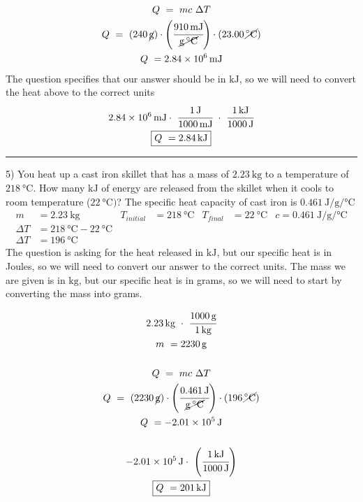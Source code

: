 \documentclass[12pt, oneside, letterpaper]{book}
\begin{document}
\begin{gather*}
    Q\ =\ mc\ \Delta T
    \\
    Q\ =\ (\qty{240}{\cancel\gram})  
        \cdot \left(\cfrac{\qty{910}{\milli\joule}}{\cancel{\si{\gram\degreeCelsius}}} \right) 
        \cdot (\qty{23.00}{\cancel \degreeCelsius})
    \\
    Q\ =\qty{2.84e6}{\milli\joule}
\end{gather*}
The question specifies that our answer should be in $\si{\kilo\joule}$, so we will need to convert the heat above to the correct units
\begin{gather*}
    \qty{2.84e6}{\milli\joule}  \cdot\ 
    \cfrac{\qty{1}{\joule}}{\qty{1000}{\milli\joule}}\   \cdot\ 
    \cfrac{\qty{1}{\kilo\joule}}{\qty{1000}{\joule}} 
    \\
    \boxed{Q\ = \qty{2.84}{\kilo\joule}}
\end{gather*}
\hrule 
5) You heat up a cast iron skillet that has a mass of $\qty{2.23}{\kilo\gram}$ to a temperature of $\qty{218}{\degreeCelsius}$. How many $\si{\kilo\joule}$ of energy are released from the skillet when it cools to room temperature ($\qty{22}{\degreeCelsius})$? The specific heat capacity of cast iron is $\qty[per-mode=fraction]{0.461}{\joule\per\gram\per\degreeCelsius}$
\begin{align*}
 m &= \qty{2.23}{\kilo\gram}  
    & T_{initial}&= \qty{218}{\degreeCelsius} 
    & T_{final} &= \qty{22}{\degreeCelsius} 
    & c = \qty[per-mode=fraction]{0.461}{\joule\per\gram\per\degreeCelsius} 
 \\
 \Delta T &= \qty{218}{\degreeCelsius} - \qty{22}{\degreeCelsius}
 \\
 \Delta T &= \qty{196}{\degreeCelsius}
\end{align*}
The question is asking for the heat released in $\si{\kilo\joule}$, but our specific heat is in Joules, so we will need to convert our answer to the correct units. The mass we are given is in $\si{\kilo\gram}$, but our specific heat is in grams, so we will need to start by converting the mass into grams.

\begin{gather*}
    \qty{2.23}{\cancel{\kilo\gram}}\ \cdot\ \cfrac{\qty{1000}{\gram}}{\qty{1}{\cancel{\kilo\gram}}} 
    \\
    m\ = \qty{2230}{\gram}
    \\
    \\
    Q\ =\ mc\ \Delta T
    \\
    Q\ =\ (\qty{2230}{\cancel\gram})  
        \cdot \left(\cfrac{\qty{0.461}{\joule}}{\cancel{\si{\gram\degreeCelsius}}} \right) 
        \cdot (\qty{196}{\cancel \degreeCelsius})
    \\
    Q\ = \qty{-2.01e5}{\joule}
    \\
    \\
    \qty{-2.01e5}{\cancel{\joule}} \cdot\ 
        \left(\cfrac{\qty{1}{\kilo\joule}}{\qty{1000}{\cancel{\joule}}} \right)
    \\
    \boxed{Q\ =\qty{201}{\kilo\joule}}
\end{gather*}
\end{document}
